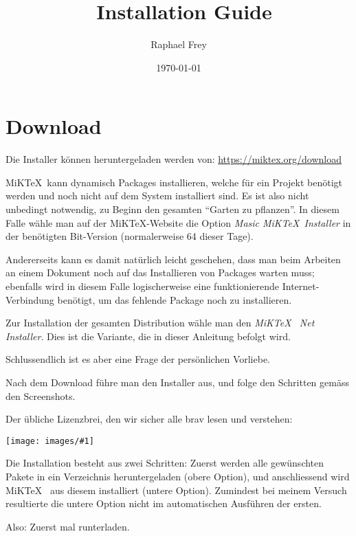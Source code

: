 \documentclass[a4paper,11pt]{article}
\title{\mt~Installation Guide}
\author{Raphael Frey}
\date{\today}
\def\mt{MiKTeX}
\newcommand{\screenshot}[1]{%
    \begin{minipage}{\textwidth}
        \vspace{1em}
        \centering
        \texttt{[image: images/\#1]}
        \vspace{1em}
    \end{minipage}}
\begin{document}
\maketitle

\section{Download}
\label{sec:download}

Die Installer k\"onnen heruntergeladen werden von: \href{https://miktex.org/download}{https://miktex.org/download}

\mt~kann dynamisch Packages installieren,  welche f\"ur ein Projekt ben\"otigt
werden  und noch  nicht auf  dem System  installiert sind. Es  ist also  nicht
unbedingt notwendig, zu Beginn den  gesamten ``Garten zu pflanzen''. In diesem
Falle w\"ahle man auf der \mt-Website die Option \emph{Masic \mt~Installer} in
der ben\"otigten Bit-Version (normalerweise 64 dieser Tage).

Andererseits  kann  es  damit  nat\"urlich leicht  geschehen,  dass  man  beim
Arbeiten  an einem  Dokument noch  auf  das Installieren  von Packages  warten
muss;  ebenfalls  wird in  diesem  Falle  logischerweise eine  funktionierende
Internet-Verbindung ben\"otigt, um das fehlende Package noch zu installieren.

Zur  Installation der  gesamten Distribution  w\"ahle man  den \emph{\mt~  Net
Installer}. Dies ist die Variante, die in dieser Anleitung befolgt wird.

Schlussendlich  ist es  aber eine  Frage der  pers\"onlichen Vorliebe. 

Nach  dem Download  f\"uhre man  den Installer  aus, und  folge den  Schritten
gem\"ass den Screenshots.

Der \"ubliche Lizenzbrei, den wir sicher alle brav lesen und verstehen:

\screenshot{miktex00.png}

Die Installation besteht aus  zwei Schritten: Zuerst werden alle gew\"unschten
Pakete in  ein Verzeichnis  heruntergeladen (obere Option),  und anschliessend
wird \mt~ aus diesem installiert (untere Option). Zumindest bei meinem Versuch
resultierte die untere Option nicht im automatischen Ausf\"uhren der ersten.

Also: Zuerst mal runterladen.
\end{document}
